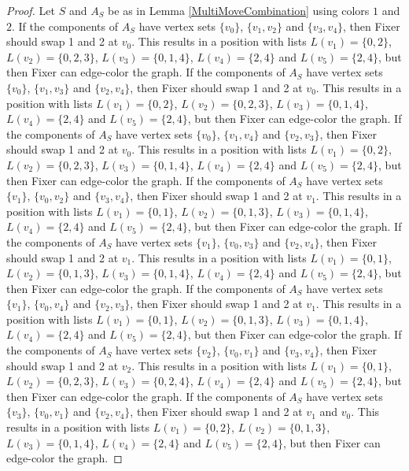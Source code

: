 \documentclass[12pt]{amsart}
\theoremstyle{plain}
\theoremstyle{definition}
\theoremstyle{remark}
\begin{document}
\begin{proof}
Let $S$ and $A_S$ be as in Lemma \ref{MultiMoveCombination} using colors $1$ and $2$. If the components of $A_S$ have vertex sets $\{v_0\}$, $\{v_1, v_2\}$ and $\{v_3, v_4\}$, then Fixer should swap 1 and 2 at $v_0$. This results in a position with lists $L(v_1) = \{0, 2\}$, $L(v_2) = \{0, 2, 3\}$, $L(v_3) = \{0, 1, 4\}$, $L(v_4) = \{2, 4\}$ and $L(v_5) = \{2, 4\}$, but then Fixer can edge-color the graph.
If the components of $A_S$ have vertex sets $\{v_0\}$, $\{v_1, v_3\}$ and $\{v_2, v_4\}$, then Fixer should swap 1 and 2 at $v_0$. This results in a position with lists $L(v_1) = \{0, 2\}$, $L(v_2) = \{0, 2, 3\}$, $L(v_3) = \{0, 1, 4\}$, $L(v_4) = \{2, 4\}$ and $L(v_5) = \{2, 4\}$, but then Fixer can edge-color the graph.
If the components of $A_S$ have vertex sets $\{v_0\}$, $\{v_1, v_4\}$ and $\{v_2, v_3\}$, then Fixer should swap 1 and 2 at $v_0$. This results in a position with lists $L(v_1) = \{0, 2\}$, $L(v_2) = \{0, 2, 3\}$, $L(v_3) = \{0, 1, 4\}$, $L(v_4) = \{2, 4\}$ and $L(v_5) = \{2, 4\}$, but then Fixer can edge-color the graph.
If the components of $A_S$ have vertex sets $\{v_1\}$, $\{v_0, v_2\}$ and $\{v_3, v_4\}$, then Fixer should swap 1 and 2 at $v_1$. This results in a position with lists $L(v_1) = \{0, 1\}$, $L(v_2) = \{0, 1, 3\}$, $L(v_3) = \{0, 1, 4\}$, $L(v_4) = \{2, 4\}$ and $L(v_5) = \{2, 4\}$, but then Fixer can edge-color the graph.
If the components of $A_S$ have vertex sets $\{v_1\}$, $\{v_0, v_3\}$ and $\{v_2, v_4\}$, then Fixer should swap 1 and 2 at $v_1$. This results in a position with lists $L(v_1) = \{0, 1\}$, $L(v_2) = \{0, 1, 3\}$, $L(v_3) = \{0, 1, 4\}$, $L(v_4) = \{2, 4\}$ and $L(v_5) = \{2, 4\}$, but then Fixer can edge-color the graph.
If the components of $A_S$ have vertex sets $\{v_1\}$, $\{v_0, v_4\}$ and $\{v_2, v_3\}$, then Fixer should swap 1 and 2 at $v_1$. This results in a position with lists $L(v_1) = \{0, 1\}$, $L(v_2) = \{0, 1, 3\}$, $L(v_3) = \{0, 1, 4\}$, $L(v_4) = \{2, 4\}$ and $L(v_5) = \{2, 4\}$, but then Fixer can edge-color the graph.
If the components of $A_S$ have vertex sets $\{v_2\}$, $\{v_0, v_1\}$ and $\{v_3, v_4\}$, then Fixer should swap 1 and 2 at $v_2$. This results in a position with lists $L(v_1) = \{0, 1\}$, $L(v_2) = \{0, 2, 3\}$, $L(v_3) = \{0, 2, 4\}$, $L(v_4) = \{2, 4\}$ and $L(v_5) = \{2, 4\}$, but then Fixer can edge-color the graph.
If the components of $A_S$ have vertex sets $\{v_3\}$, $\{v_0, v_1\}$ and $\{v_2, v_4\}$, then Fixer should swap 1 and 2 at $v_1$ and $v_0$. This results in a position with lists $L(v_1) = \{0, 2\}$, $L(v_2) = \{0, 1, 3\}$, $L(v_3) = \{0, 1, 4\}$, $L(v_4) = \{2, 4\}$ and $L(v_5) = \{2, 4\}$, but then Fixer can edge-color the graph.

\end{proof}
\end{document}
